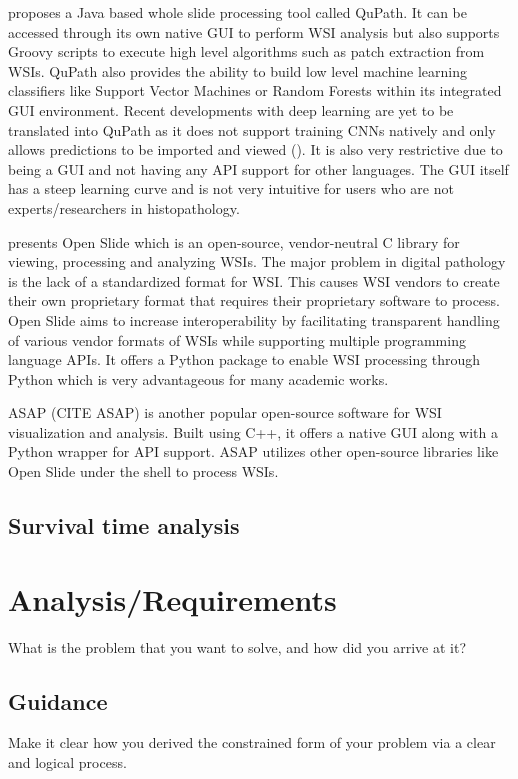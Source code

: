\documentclass{l4proj}
\begin{document}
\cite{bankhead2017qupath} proposes a Java based whole slide processing tool called QuPath. It can be accessed through its own native GUI to perform WSI analysis but also supports Groovy scripts to execute high level algorithms such as patch extraction from WSIs. QuPath also provides the ability to build low level machine learning classifiers like Support Vector Machines or Random Forests within its integrated GUI environment. Recent developments with deep learning are yet to be translated into QuPath as it does not support  training CNNs natively and only allows predictions to be imported and viewed (\cite{pedersen2021fastpathology}). It is also very restrictive due to being a GUI and not having any API support for other languages. The GUI itself has a steep learning curve and is not very intuitive for users who are not experts/researchers in histopathology. 

\cite{goode2013openslide} presents Open Slide which is an open-source, vendor-neutral C library for viewing, processing and analyzing WSIs. The major problem in digital pathology is the lack of a standardized format for WSI. This causes WSI vendors to create their own proprietary format that requires their proprietary software to process. Open Slide aims to increase interoperability by facilitating transparent handling of various vendor formats of WSIs while supporting multiple programming language APIs. It offers a Python package to enable WSI processing through Python which is very advantageous for many academic works.   

ASAP (CITE ASAP) is another popular open-source software for WSI visualization and analysis. Built using C++, it offers a native GUI along with a Python wrapper for API support. ASAP utilizes other open-source libraries like Open Slide under the shell to process WSIs.   


\section{Survival time analysis}

\chapter{Analysis/Requirements}
What is the problem that you want to solve, and how did you arrive at it?
\section{Guidance}
Make it clear how you derived the constrained form of your problem via a clear and logical process. 
\end{document}

